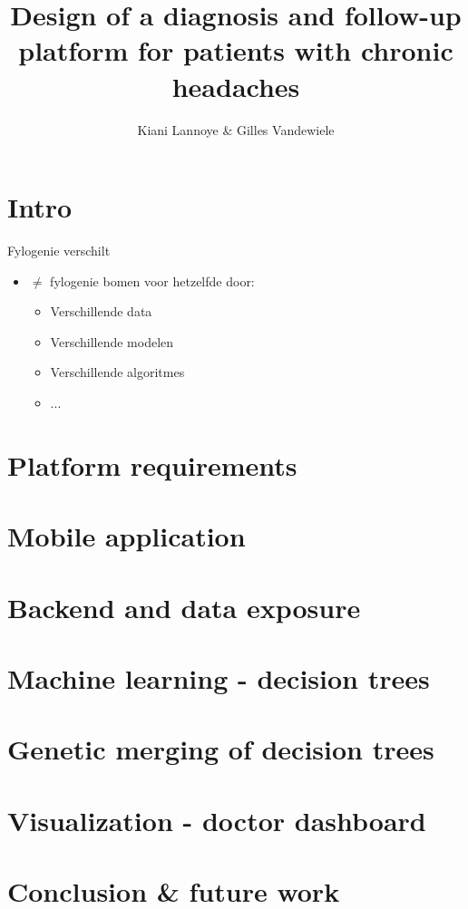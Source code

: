 \documentclass[english]{beamer}
\title{Design of a diagnosis and follow-up platform for patients with chronic headaches}
\author{Kiani Lannoye \& Gilles Vandewiele}
\begin{document}
\begin{frame}
	\titlepage
\end{frame}

\section{Intro}
\label{sec:intro}
\begin{frame}{Fylogenie verschilt}
\begin{itemize}
	\item $\neq$ fylogenie bomen voor hetzelfde door:
	\begin{itemize}
		\item Verschillende data
		\item Verschillende modelen
		\item Verschillende algoritmes
		\item ...
	\end{itemize}
\end{itemize}
\end{frame}
\section{Platform requirements}
\label{sec:simMess}
\section{Mobile application}
\section{Backend and data exposure}
\section{Machine learning - decision trees}
\section{Genetic merging of decision trees}
\section{Visualization - doctor dashboard}
\section{Conclusion \& future work}
\end{document}
